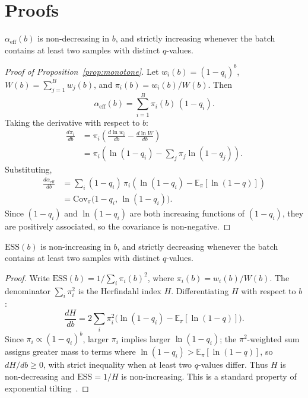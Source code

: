 \section{Proofs}
\label{app:proofs}

\begin{proposition}
\label{prop:monotone}
$\alpha_{\mathrm{eff}}(b)$ is non-decreasing in $b$, and strictly increasing whenever the batch contains at least two samples with distinct $q$-values.
\end{proposition}

\begin{proof}[Proof of Proposition~\ref{prop:monotone}]
Let $w_i(b) = (1 - q_i)^b$, $W(b) = \sum_{j=1}^B w_j(b)$, and $\pi_i(b) = w_i(b) / W(b)$.
Then
\begin{equation*}
  \alpha_{\mathrm{eff}}(b) = \sum_{i=1}^{B} \pi_i(b)\, (1 - q_i).
\end{equation*}
Taking the derivative with respect to $b$:
\begin{align*}
  \frac{d\pi_i}{db}
  &= \pi_i \!\left(\frac{d \ln w_i}{db} - \frac{d \ln W}{db}\right) \\
  &= \pi_i \!\left(\ln(1{-}q_i) - \textstyle\sum_j \pi_j \ln(1{-}q_j)\right).
\end{align*}
Substituting,
\begin{align*}
  \frac{d\alpha_{\mathrm{eff}}}{db}
  &= \sum_i (1{-}q_i)\, \pi_i \!\left(\ln(1{-}q_i) - \mathbb{E}_{\pi}[\ln(1{-}q)]\right) \\
  &= \mathrm{Cov}_{\pi}\!\bigl(1{-}q_i,\, \ln(1{-}q_i)\bigr).
\end{align*}
Since $(1{-}q_i)$ and $\ln(1{-}q_i)$ are both increasing functions of $(1{-}q_i)$, they are positively associated, so the covariance is non-negative.
\end{proof}

\begin{proposition}
\label{prop:ess_mono}
$\mathrm{ESS}(b)$ is non-increasing in $b$, and strictly decreasing whenever the batch contains at least two samples with distinct $q$-values.
\end{proposition}

\begin{proof}
Write $\mathrm{ESS}(b) = 1 / \sum_i \pi_i(b)^2$, where $\pi_i(b) = w_i(b) / W(b)$.
The denominator $\sum_i \pi_i^2$ is the Herfindahl index $H$.
Differentiating $H$ with respect to $b$:
\begin{equation*}
  \frac{dH}{db} = 2 \sum_i \pi_i^2 \bigl(\ln(1{-}q_i) - \mathbb{E}_{\pi}[\ln(1{-}q)]\bigr).
\end{equation*}
Since $\pi_i \propto (1{-}q_i)^b$, larger $\pi_i$ implies larger $\ln(1{-}q_i)$; the $\pi^2$-weighted sum assigns greater mass to terms where $\ln(1{-}q_i) > \mathbb{E}_\pi[\ln(1{-}q)]$, so $dH/db \geq 0$, with strict inequality when at least two $q$-values differ.
Thus $H$ is non-decreasing and $\mathrm{ESS} = 1/H$ is non-increasing.
This is a standard property of exponential tilting~\citep{kish1965survey,owen2013mc}.
\end{proof}

